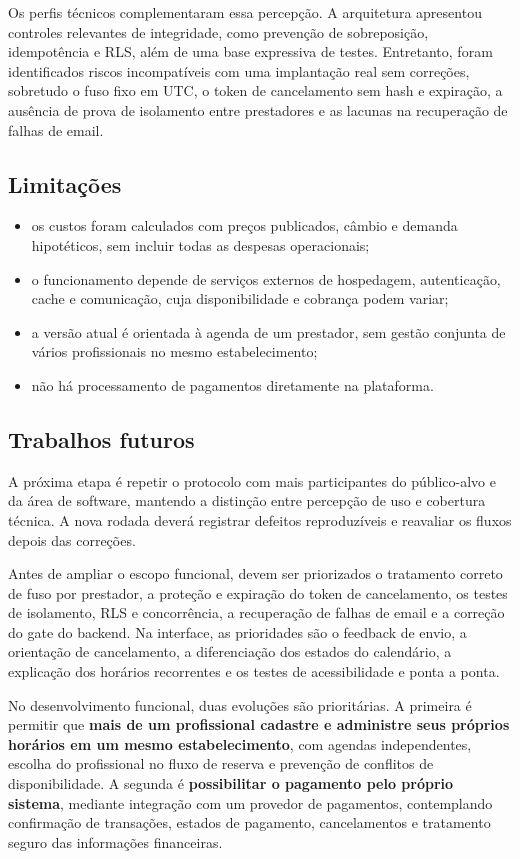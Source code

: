 Os perfis técnicos complementaram essa percepção. A arquitetura apresentou controles relevantes de integridade, como prevenção de sobreposição, idempotência e RLS, além de uma base expressiva de testes. Entretanto, foram identificados riscos incompatíveis com uma implantação real sem correções, sobretudo o fuso fixo em UTC, o token de cancelamento sem hash e expiração, a ausência de prova de isolamento entre prestadores e as lacunas na recuperação de falhas de email.

\subsection{Limitações}

\begin{itemize}
    \item os custos foram calculados com preços publicados, câmbio e demanda hipotéticos, sem incluir todas as despesas operacionais;
    \item o funcionamento depende de serviços externos de hospedagem, autenticação, cache e comunicação, cuja disponibilidade e cobrança podem variar;
    \item a versão atual é orientada à agenda de um prestador, sem gestão conjunta de vários profissionais no mesmo estabelecimento;
    \item não há processamento de pagamentos diretamente na plataforma.
\end{itemize}

\subsection{Trabalhos futuros}

A próxima etapa é repetir o protocolo com mais participantes do público-alvo e da área de software, mantendo a distinção entre percepção de uso e cobertura técnica. A nova rodada deverá registrar defeitos reproduzíveis e reavaliar os fluxos depois das correções.

Antes de ampliar o escopo funcional, devem ser priorizados o tratamento correto de fuso por prestador, a proteção e expiração do token de cancelamento, os testes de isolamento, RLS e concorrência, a recuperação de falhas de email e a correção do gate do backend. Na interface, as prioridades são o feedback de envio, a orientação de cancelamento, a diferenciação dos estados do calendário, a explicação dos horários recorrentes e os testes de acessibilidade e ponta a ponta.

No desenvolvimento funcional, duas evoluções são prioritárias. A primeira é permitir que \textbf{mais de um profissional cadastre e administre seus próprios horários em um mesmo estabelecimento}, com agendas independentes, escolha do profissional no fluxo de reserva e prevenção de conflitos de disponibilidade. A segunda é \textbf{possibilitar o pagamento pelo próprio sistema}, mediante integração com um provedor de pagamentos, contemplando confirmação de transações, estados de pagamento, cancelamentos e tratamento seguro das informações financeiras.

